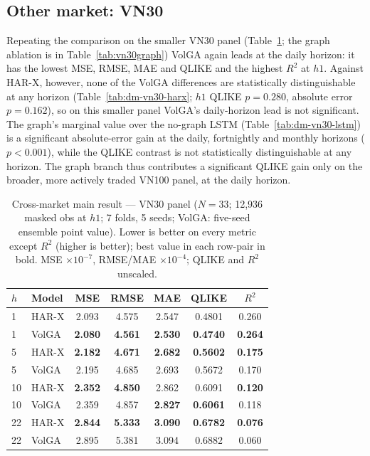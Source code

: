 \documentclass{llncs}
\begin{document}
\subsection{Other market: VN30}\label{sec:vn30}
Repeating the comparison on the smaller VN30 panel (Table~\ref{tab:vn30main}; the graph ablation is in
Table~\ref{tab:vn30graph}) VolGA again leads at the
daily horizon: it has the lowest MSE, RMSE, MAE and QLIKE and the highest $R^2$ at $h1$. Against HAR-X,
however, none of the VolGA differences are statistically distinguishable at any horizon
(Table~\ref{tab:dm-vn30-harx}; $h1$ QLIKE $p=0.280$, absolute error $p=0.162$), so on this smaller
panel VolGA's daily-horizon lead is not significant. The graph's marginal value over the no-graph LSTM
(Table~\ref{tab:dm-vn30-lstm}) is a significant absolute-error gain at the daily, fortnightly and
monthly horizons ($p<0.001$), while the QLIKE contrast is not statistically distinguishable at any
horizon. The graph branch thus contributes a significant QLIKE gain only on the broader, more actively
traded VN100 panel, at the daily horizon.

\begin{table}[t]
\centering
\caption{Cross-market main result --- VN30 panel ($N=33$; 12{,}936 masked obs at $h1$; 7 folds, 5
seeds; VolGA: five-seed ensemble point value). Lower is better on every metric except $R^2$ (higher is
better); best value in each row-pair in bold. MSE $\times10^{-7}$, RMSE/MAE $\times10^{-4}$; QLIKE and
$R^2$ unscaled.}
\label{tab:vn30main}
\footnotesize
\setlength{\tabcolsep}{6pt}
\begin{tabular}{llccccc}
\toprule
$h$ & Model & MSE & RMSE & MAE & QLIKE & $R^2$ \\
\midrule
1 & HAR-X & 2.093 & 4.575 & 2.547 & 0.4801 & 0.260 \\
1 & VolGA & \textbf{2.080} & \textbf{4.561} & \textbf{2.530} & \textbf{0.4740} & \textbf{0.264} \\
\midrule
5 & HAR-X & \textbf{2.182} & \textbf{4.671} & \textbf{2.682} & \textbf{0.5602} & \textbf{0.175} \\
5 & VolGA & 2.195 & 4.685 & 2.693 & 0.5672 & 0.170 \\
\midrule
10 & HAR-X & \textbf{2.352} & \textbf{4.850} & 2.862 & 0.6091 & \textbf{0.120} \\
10 & VolGA & 2.359 & 4.857 & \textbf{2.827} & \textbf{0.6061} & 0.118 \\
\midrule
22 & HAR-X & \textbf{2.844} & \textbf{5.333} & \textbf{3.090} & \textbf{0.6782} & \textbf{0.076} \\
22 & VolGA & 2.895 & 5.381 & 3.094 & 0.6882 & 0.060 \\
\bottomrule
\end{tabular}
\end{table}
\end{document}
